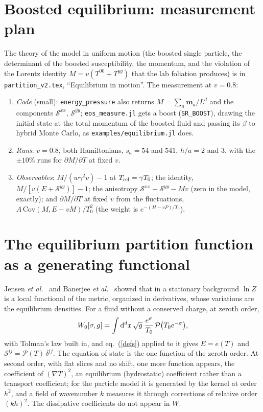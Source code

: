 \documentclass[11pt,aps,preprint,nofootinbib,superscriptaddress,tightenlines]{revtex4-2}
\def\pdense{M}
\def\Sstress{{\mathcal S}}
\def\pr{{\mathcal P}}
\def\er{e}
\def\dd{{\rm d}}
\def\st{\begin{equation}}
\def\stp{\end{equation}}
\def\Eq#1{eq.~(\ref{#1})}
\begin{document}
\section{Boosted equilibrium: measurement plan}
\label{sec:boost}

The theory of the model in uniform motion (the boosted single particle, the determinant of the boosted susceptibility, the momentum, and the violation of the
Lorentz identity $\pdense=v(T^{00}+T^{yy})$ that the lab foliation produces) is in \nolinkurl{partition_v2.tex}, ``Equilibrium in motion''.  The
measurement at $v=0.8$:
\begin{enumerate}
\item \emph{Code} (small): \texttt{energy\_pressure} also returns $\pdense=\sum_a\bm m_a/L^d$ and the components $\Sstress^{xx}$, $\Sstress^{yy}$; \texttt{eos\_measure.jl} gets a
  boost (\texttt{SR\_BOOST}), drawing the initial state at the total momentum of the boosted fluid and passing its $\beta$ to hybrid Monte Carlo, as
  \texttt{examples/equilibrium.jl} does.
\item \emph{Runs}: $v=0.8$, both Hamiltonians, $s_a=54$ and $541$, $h/a=2$ and $3$, with the $\pm10\%$ runs for $\partial\pdense/\partial T$ at fixed $v$.
\item \emph{Observables}: $\pdense/(w\gamma^2v)-1$ at $T_{\rm rel}=\gamma T_0$; the identity, $\pdense/[v(E+\Sstress^{yy})]-1$; the anisotropy $\Sstress^{xx}-\Sstress^{yy}-\pdense v$
  (zero in the model, exactly); and $\partial\pdense/\partial T$ at fixed $v$ from the fluctuations, $A\,\mathrm{Cov}(\pdense,E-v\pdense)/T_0^2$ (the weight is
  $e^{-(H-vP)/T_0}$).
\end{enumerate}

\section{The equilibrium partition function as a generating functional}
\label{sec:jensen}

Jensen \emph{et al.}\ \cite{Jensen:2012jh} and Banerjee \emph{et al.}\ \cite{Banerjee:2012iz} showed that in a stationary background $\ln Z$ is a local functional of the
metric, organized in derivatives, whose variations are the equilibrium densities.  For a fluid without a conserved charge, at zeroth order,
\st
W_0[\sigma,g]=\int\dd^dx\,\sqrt g\;\frac{e^{\sigma}}{T_0}\,\pr\big(T_0e^{-\sigma}\big) ,
\stp
with Tolman's law built in, and \Eq{defs} applied to it gives $E=\er(T)$ and $\Sstress^{ij}=\pr(T)\,\delta^{ij}$.  The equation of state is the one function of the zeroth
order.  At second order, with flat slices and no shift, one more function appears, the coefficient of $(\nabla T)^2$, an equilibrium (hydrostatic) coefficient rather than
a transport coefficient; for the particle model it is generated by the kernel at order $h^2$, and a field of wavenumber $k$ measures it through corrections of relative
order $(kh)^2$.  The dissipative coefficients do not appear in $W$.
\end{document}
